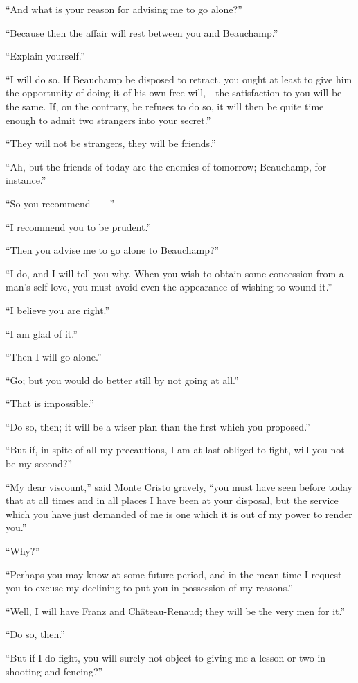 “And what is your reason for advising me to go alone?”

“Because then the affair will rest between you and Beauchamp.”

“Explain yourself.”

“I will do so. If Beauchamp be disposed to retract, you ought at least
to give him the opportunity of doing it of his own free will,—the
satisfaction to you will be the same. If, on the contrary, he refuses
to do so, it will then be quite time enough to admit two strangers into
your secret.”

“They will not be strangers, they will be friends.”

“Ah, but the friends of today are the enemies of tomorrow; Beauchamp,
for instance.”

“So you recommend——”

“I recommend you to be prudent.”

“Then you advise me to go alone to Beauchamp?”

“I do, and I will tell you why. When you wish to obtain some concession
from a man’s self-love, you must avoid even the appearance of wishing
to wound it.”

“I believe you are right.”

“I am glad of it.”

“Then I will go alone.”

“Go; but you would do better still by not going at all.”

“That is impossible.”

“Do so, then; it will be a wiser plan than the first which you
proposed.”

“But if, in spite of all my precautions, I am at last obliged to fight,
will you not be my second?”

“My dear viscount,” said Monte Cristo gravely, “you must have seen
before today that at all times and in all places I have been at your
disposal, but the service which you have just demanded of me is one
which it is out of my power to render you.”

“Why?”

“Perhaps you may know at some future period, and in the mean time I
request you to excuse my declining to put you in possession of my
reasons.”

“Well, I will have Franz and Château-Renaud; they will be the very men
for it.”

“Do so, then.”

“But if I do fight, you will surely not object to giving me a lesson or
two in shooting and fencing?”

